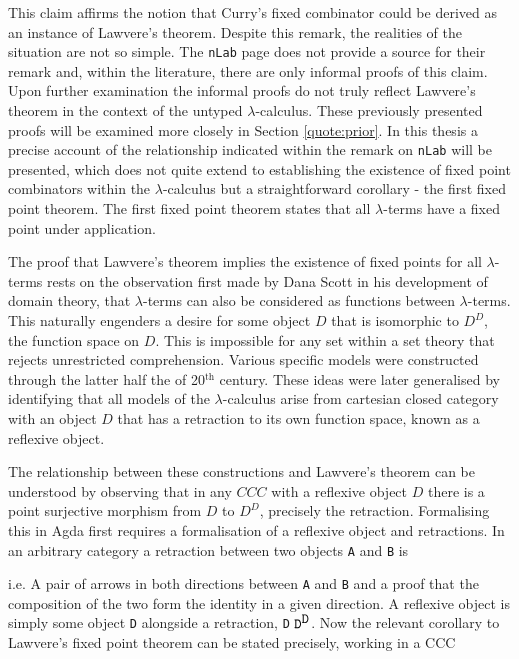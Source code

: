 This claim affirms the notion that Curry's fixed combinator could be derived as
an instance of Lawvere's theorem. Despite this remark, the realities of the
situation are not so simple. The \verb|nLab| page does not provide a source for
their remark and, within the literature, there are only informal proofs of this
claim. Upon further examination the informal proofs do not truly reflect Lawvere's theorem in the
context of the untyped $\lambda$-calculus. These
previously presented proofs will be examined more closely in Section
\ref{quote:prior}. In this
thesis a precise account of the relationship indicated within
the remark on \verb|nLab| will be presented, which does not quite extend to establishing the
existence of fixed point combinators within the $\lambda$-calculus but a
straightforward corollary - the first fixed point theorem. The first fixed point
theorem states that all $\lambda$-terms have a fixed point under application.

The proof that Lawvere's theorem implies the existence of fixed points for all
$\lambda$-terms rests on the observation first made by Dana Scott in his
development of domain theory, that $\lambda$-terms can also be considered as functions between $\lambda$-terms. This naturally
engenders a desire for some object $D$ that is isomorphic to $D^D$, the function
space on $D$. This is impossible for any set within a set theory that rejects
unrestricted comprehension. Various specific models were constructed through the
latter half the of 20$^{\textrm{th}}$ century. These
ideas were later generalised by identifying that all models of the
$\lambda$-calculus arise from cartesian closed category with an object $D$ that
has a retraction to its own function space, known as a reflexive object.

The relationship between these constructions and Lawvere's theorem can be
understood by observing that in any $CCC$ with a reflexive object $D$ there is a
point surjective morphism from $D$ to $D^D$, precisely the retraction.
Formalising this in Agda first requires a formalisation of a reflexive object
and retractions. In an arbitrary category a retraction between two objects
\verb|A| and \verb|B| is


i.e. A pair of arrows in both directions between \verb|A| and \verb|B| and a
proof that the composition of the two form the identity in a given direction.
A reflexive object is simply some object \verb|D| alongside a retraction,
 \verb|D| $\verb|D|^{\verb|D|}$. Now the relevant
corollary to Lawvere's fixed point theorem can be stated precisely, working in a
CCC


